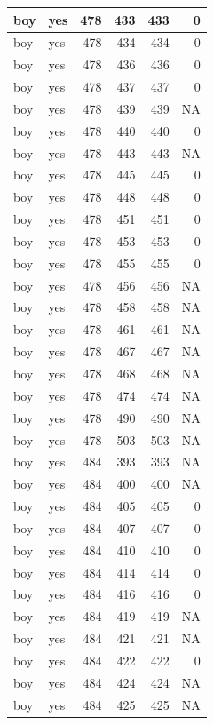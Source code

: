 \documentclass[man]{apa6}
\begin{document}
\begin{tabular}{l|l|r|r|r|r}
\hline
boy & yes & 478 & 433 & 433 & 0\\
\hline
boy & yes & 478 & 434 & 434 & 0\\
\hline
boy & yes & 478 & 436 & 436 & 0\\
\hline
boy & yes & 478 & 437 & 437 & 0\\
\hline
boy & yes & 478 & 439 & 439 & NA\\
\hline
boy & yes & 478 & 440 & 440 & 0\\
\hline
boy & yes & 478 & 443 & 443 & NA\\
\hline
boy & yes & 478 & 445 & 445 & 0\\
\hline
boy & yes & 478 & 448 & 448 & 0\\
\hline
boy & yes & 478 & 451 & 451 & 0\\
\hline
boy & yes & 478 & 453 & 453 & 0\\
\hline
boy & yes & 478 & 455 & 455 & 0\\
\hline
boy & yes & 478 & 456 & 456 & NA\\
\hline
boy & yes & 478 & 458 & 458 & NA\\
\hline
boy & yes & 478 & 461 & 461 & NA\\
\hline
boy & yes & 478 & 467 & 467 & NA\\
\hline
boy & yes & 478 & 468 & 468 & NA\\
\hline
boy & yes & 478 & 474 & 474 & NA\\
\hline
boy & yes & 478 & 490 & 490 & NA\\
\hline
boy & yes & 478 & 503 & 503 & NA\\
\hline
boy & yes & 484 & 393 & 393 & NA\\
\hline
boy & yes & 484 & 400 & 400 & NA\\
\hline
boy & yes & 484 & 405 & 405 & 0\\
\hline
boy & yes & 484 & 407 & 407 & 0\\
\hline
boy & yes & 484 & 410 & 410 & 0\\
\hline
boy & yes & 484 & 414 & 414 & 0\\
\hline
boy & yes & 484 & 416 & 416 & 0\\
\hline
boy & yes & 484 & 419 & 419 & NA\\
\hline
boy & yes & 484 & 421 & 421 & NA\\
\hline
boy & yes & 484 & 422 & 422 & 0\\
\hline
boy & yes & 484 & 424 & 424 & NA\\
\hline
boy & yes & 484 & 425 & 425 & NA\\

\end{tabular}
\end{document}
